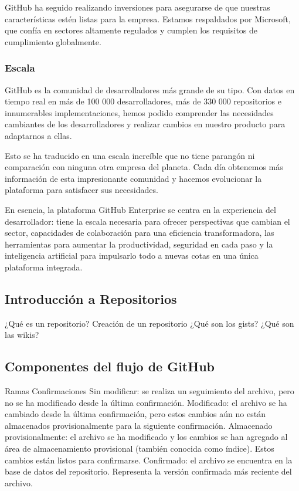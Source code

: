 GitHub ha seguido realizando inversiones para asegurarse de que nuestras características estén 
listas para la empresa. Estamos respaldados por Microsoft, que confía en sectores altamente 
regulados y cumplen los requisitos de cumplimiento globalmente.

\subsubsection*{Escala}

GitHub es la comunidad de desarrolladores más grande de su tipo. Con datos en tiempo real en
más de 100 000 desarrolladores, más de 330 000 repositorios e innumerables implementaciones, 
hemos podido comprender las necesidades cambiantes de los desarrolladores y realizar cambios 
en nuestro producto para adaptarnos a ellas.

Esto se ha traducido en una escala increíble que no tiene parangón ni comparación con ninguna 
otra empresa del planeta. Cada día obtenemos más información de esta impresionante comunidad y 
hacemos evolucionar la plataforma para satisfacer sus necesidades.

En esencia, la plataforma GitHub Enterprise se centra en la experiencia del desarrollador: tiene 
la escala necesaria para ofrecer perspectivas que cambian el sector, capacidades de colaboración 
para una eficiencia transformadora, las herramientas para aumentar la productividad, seguridad 
en cada paso y la inteligencia artificial para impulsarlo todo a nuevas cotas en una 
única plataforma integrada.

\subsection*{Introducción a Repositorios}

¿Qué es un repositorio?
Creación de un repositorio
¿Qué son los gists?
¿Qué son las wikis?


\subsection*{Componentes del flujo de GitHub}

Ramas
Confirmaciones
    Sin modificar: se realiza un seguimiento del archivo, pero no se ha modificado desde la última confirmación.
    Modificado: el archivo se ha cambiado desde la última confirmación, pero estos cambios aún no están almacenados provisionalmente para la siguiente confirmación.
    Almacenado provisionalmente: el archivo se ha modificado y los cambios se han agregado al área de almacenamiento provisional (también conocida como índice). Estos cambios están listos para confirmarse.
    Confirmado: el archivo se encuentra en la base de datos del repositorio. Representa la versión confirmada más reciente del archivo.


